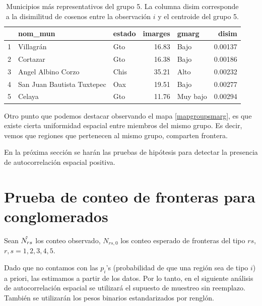 \begin{itemize}
\begin{table}[ht]
\centering
\begin{tabular}{rllrlr}
  \hline
 & nom\_mun & estado & imarges & gmarg & disim \\ 
  \hline
1 & Villagrán & Gto & 16.83 & Bajo & 0.00137 \\ 
  2 & Cortazar & Gto & 16.38 & Bajo & 0.00186 \\ 
  3 & Angel Albino Corzo & Chis & 35.21 & Alto & 0.00232 \\ 
  4 & San Juan Bautista Tuxtepec & Oax & 19.51 & Bajo & 0.00277 \\ 
  5 & Celaya & Gto & 11.76 & Muy bajo & 0.00294 \\ 
   \hline
\end{tabular}
\caption{Municipios más representativos del grupo 5. La columna disim corresponde a la disimilitud de cosenos entre la observación $i$ y el centroide del grupo 5. \label{tab:grupo5}}
\end{table}

\end{itemize}

Otro punto que podemos destacar observando el mapa \ref{mapgroupsmarg}, es que existe cierta uniformidad espacial entre miembros del mismo grupo. Es decir, vemos que regiones que pertenecen al mismo grupo, comparten frontera. 

En la próxima sección se harán las pruebas de hipótesis para detectar la presencia de autocorrelación espacial positiva.


\section{Prueba de conteo de fronteras para conglomerados}

Sean $\Hat{N_{rs}}$ los conteo observado,  $N_{rs,0}$ los conteo esperado de fronteras del tipo $rs$, $r,s=1,2,3,4,5$.

Dado que no contamos con las $p_i$'s (probabilidad de que una región sea de tipo $i$) a priori, las estimamos a partir de los datos. Por lo tanto, en el siguiente análisis de autocorrelación espacial se utilizará el supuesto de muestreo sin reemplazo. También se utilizarán los pesos binarios estandarizados por renglón.

